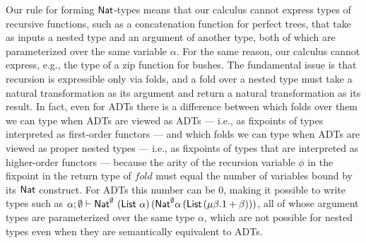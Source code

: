 \documentclass[runningheads]{llncs}
\newcommand{\fold}{\mathit{fold}}
\begin{document}
Our rule for forming $\mathsf{Nat}$-types means that 
our calculus cannot express types of recursive functions, such as a
concatenation function for perfect trees, that take as inputs a nested
type and an argument of another type, both of which are parameterized
over the same variable $\alpha$.
For the same reason, our calculus cannot express, e.g., the type of a
zip function for bushes. The fundamental
issue is that recursion is expressible only via folds, and a fold over
a nested type must take a natural transformation as its argument and
return a natural transformation as its result.
In fact, even for ADTs there is a difference between which folds over
them we can type when ADTs are viewed as ADTs --- i.e., as fixpoints
of types interpreted as first-order functors --- and which folds we
can type when ADTs are viewed as proper nested types --- i.e., as
fixpoints of types that are interpreted as higher-order functors ---
because the arity of the recursion variable $\phi$ in the fixpoint in
the return type of $\fold$ must equal the number of variables bound by
its $\mathsf{Nat}$ construct. For ADTs this number can be $0$, making it
possible to write types such as $\alpha; \emptyset \vdash
\mathsf{Nat}^\emptyset \ (\mathsf{List}\,\,\alpha)\,(\mathsf{Nat}^\emptyset \alpha\,(\mathsf{List}\, (\mu
\beta. 1 + \beta)))$, all of whose argument types are parameterized
over the same type $\alpha$, which are not possible for nested types
even when they are semantically equivalent to ADTs.
%
%
\end{document}
